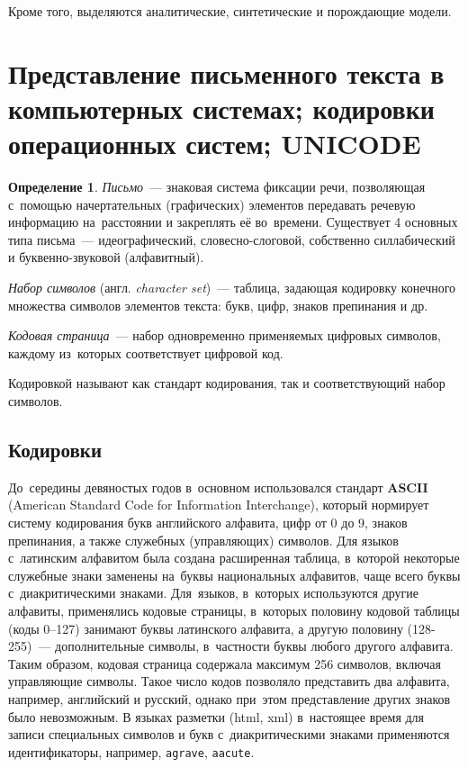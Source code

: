 \documentclass[12pt]{article}
\theoremstyle{definition}
\newtheorem*{defn}{Определение}
\theoremstyle{remark}
\numberwithin{equation}{section}
\begin{document}
Кроме того, выделяются аналитические, синтетические и порождающие модели.

\section{Представление письменного текста в компьютерных системах; кодировки операционных систем; UNICODE}
\begin{defn}
\textsl{Письмо}~--- знаковая система фиксации речи, позволяющая с~помощью
начертательных (графических) элементов передавать речевую информацию
на~расстоянии и закреплять её во~времени. Существует 4 основных типа
письма~--- идеографический, словесно-слоговой, собственно силлабический
и буквенно-звуковой (алфавитный).

{\sl Набор символов} (англ. {\sl character set})~--- таблица, задающая
кодировку конечного множества символов элементов текста: букв, цифр,
знаков препинания и др.

{\sl Кодовая страница}~--- набор одновременно применяемых цифровых символов,
каждому из~которых соответствует цифровой код.
\end{defn}

Кодировкой называют как стандарт кодирования, так и соответствующий набор
символов.

\subsection{Кодировки}
До~середины девяностых годов в~основном использовался стандарт \textbf{ASCII}
(American Standard Code for Information Interchange), который нормирует систему
кодирования букв английского алфавита, цифр от 0 до 9, знаков препинания, а также
служебных (управляющих) символов. Для языков с~латинским алфавитом была создана
расширенная таблица, в~которой некоторые служебные знаки заменены на~буквы
национальных алфавитов, чаще всего буквы с~диакритическими знаками. Для~языков,
в~которых используются другие алфавиты, применялись кодовые страницы, в~которых
половину кодовой таблицы (коды 0--127) занимают буквы латинского алфавита,
а другую половину (128-255)~--- дополнительные символы, в~частности буквы любого
другого алфавита. Таким образом, кодовая страница содержала максимум 256 символов,
включая управляющие символы. Такое число кодов позволяло представить два алфавита,
например, английский и русский, однако при~этом представление других знаков
было невозможным. В языках разметки (html, xml) в~настоящее время для записи
специальных символов и букв с~диакритическими знаками применяются идентификаторы,
например, \texttt{agrave}, \texttt{aacute}.
\end{document}
